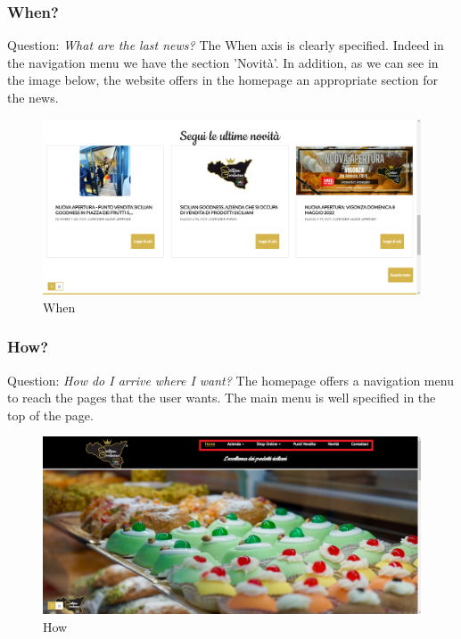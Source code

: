 \subsubsection{When?}

Question: \textit{What are the last news?}
\newline
The When axis is clearly specified. Indeed in the navigation menu we have the section 'Novità'.
In addition, as we can see in the image below, the website offers in the homepage an appropriate section for the news.

\begin{figure}[H]
	\centering\includegraphics[width=12cm]{Img/news.png}
	\caption{When}
\end{figure}

\subsubsection{How?}

Question: \textit{How do I arrive where I want?}
\newline
The homepage offers a navigation menu to reach the pages that the user wants. The main menu is well specified in the top of the page.

\begin{figure}[H]
	\centering\includegraphics[width=12cm]{Img/how.png}
	\caption{How}
\end{figure}

